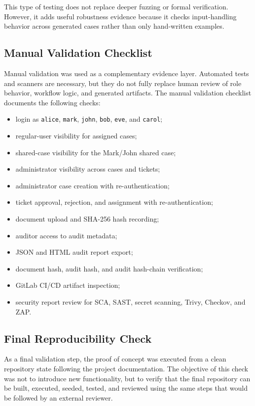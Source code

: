 \documentclass[12pt,a4paper]{report}
\begin{document}
This type of testing does not replace deeper fuzzing or formal verification. However, it adds useful robustness evidence because it checks input-handling behavior across generated cases rather than only hand-written examples.

\subsection{Manual Validation Checklist}

Manual validation was used as a complementary evidence layer. Automated tests and scanners are necessary, but they do not fully replace human review of role behavior, workflow logic, and generated artifacts. The manual validation checklist documents the following checks:

\begin{itemize}
    \item login as \texttt{alice}, \texttt{mark}, \texttt{john}, \texttt{bob}, \texttt{eve}, and \texttt{carol};
    \item regular-user visibility for assigned cases;
    \item shared-case visibility for the Mark/John shared case;
    \item administrator visibility across cases and tickets;
    \item administrator case creation with re-authentication;
    \item ticket approval, rejection, and assignment with re-authentication;
    \item document upload and SHA-256 hash recording;
    \item auditor access to audit metadata;
    \item JSON and HTML audit report export;
    \item document hash, audit hash, and audit hash-chain verification;
    \item GitLab CI/CD artifact inspection;
    \item security report review for SCA, SAST, secret scanning, Trivy, Checkov, and ZAP.
\end{itemize}

\subsection{Final Reproducibility Check}

As a final validation step, the proof of concept was executed from a clean repository state following the project documentation. The objective of this check was not to introduce new functionality, but to verify that the final repository can be built, executed, seeded, tested, and reviewed using the same steps that would be followed by an external reviewer.
\end{document}

